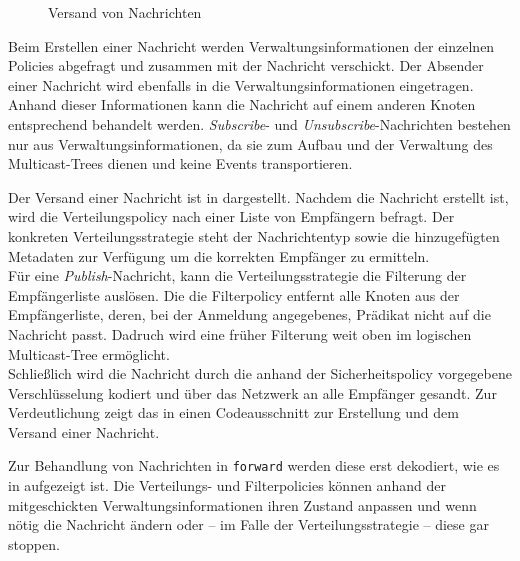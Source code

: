 \begin{figure}[htbp]
\centering
{}
\caption{Versand von Nachrichten}
\label{fig:processing_send}
\end{figure}

Beim Erstellen einer Nachricht werden Verwaltungsinformationen der einzelnen Policies abgefragt und zusammen mit der Nachricht verschickt. Der Absender einer Nachricht wird ebenfalls in die Verwaltungsinformationen eingetragen. Anhand dieser Informationen kann die Nachricht auf einem anderen Knoten entsprechend behandelt werden. \emph{Subscribe}- und \emph{Unsubscribe}-Nachrichten bestehen nur aus Verwaltungsinformationen, da sie zum Aufbau und der Verwaltung des Multicast-Trees dienen und keine Events transportieren.

Der Versand einer Nachricht ist in  dargestellt. Nachdem die Nachricht erstellt ist, wird die Verteilungspolicy nach einer Liste von Empfängern befragt. Der konkreten Verteilungsstrategie steht der Nachrichtentyp sowie die hinzugefügten Metadaten zur Verfügung um die korrekten Empfänger zu ermitteln.\\
Für eine \emph{Publish}-Nachricht, kann die Verteilungsstrategie die Filterung der Empfänger\-liste auslösen. Die die Filterpolicy entfernt alle Knoten aus der Empfängerliste, deren, bei der Anmeldung angegebenes, Prädikat nicht auf die Nachricht passt. Dadruch wird eine früher Filterung weit oben im logischen Multicast-Tree ermöglicht.\\
Schließlich wird die Nachricht durch die anhand der Sicherheitspolicy vorgegebene Verschlüsselung kodiert und über das Netzwerk an alle Empfänger gesandt. Zur Verdeutlichung zeigt das  in  einen Codeausschnitt zur Erstellung und dem Versand einer Nachricht. 

Zur Behandlung von Nachrichten in \texttt{forward} werden diese erst dekodiert, wie es in  aufgezeigt ist. Die Verteilungs- und Filterpolicies können anhand der mitgeschickten Verwaltungsinformationen ihren Zustand anpassen und wenn nötig die Nachricht ändern oder -- im Falle der Verteilungsstrategie -- diese gar stoppen.

